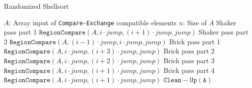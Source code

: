 \begin{algorithm}
\caption{Randomized Shellsort}\label{RandomizedShellsort}
\begin{algorithmic}[1]
	\Statex $A$: Array input of \texttt{Compare-Exchange} compatible elements
	\Statex $n$: Size of $A$
	\Comment Shaker pass part 1
		\State $\mathtt{RegionCompare}(A, i\cdot jump, (i+1)\cdot jump, jump)$
	\EndFor
	\Comment Shaker pass part 2
		\State $\mathtt{RegionCompare}(A, (i-1)\cdot jump, i\cdot jump, jump)$
	\EndFor
	\Comment Brick pass part 1
		\State $\mathtt{RegionCompare}(A, i\cdot jump, (i+3)\cdot jump, jump)$
	\EndFor
	\Comment Brick pass part 2
		\State $\mathtt{RegionCompare}(A, i\cdot jump, (i+2)\cdot jump, jump)$
	\EndFor
	\Comment Brick pass part 3
		\State $\mathtt{RegionCompare}(A, i\cdot jump, (i+1)\cdot jump, jump)$
	\EndFor
	\Comment Brick pass part 4
		\State $\mathtt{RegionCompare}(A, i \cdot jump, (i+1)\cdot jump, jump)$
	\EndFor
\EndFor
\State $\mathtt{Clean-Up(A)}$
\EndProcedure
\end{algorithmic}
\end{algorithm}
